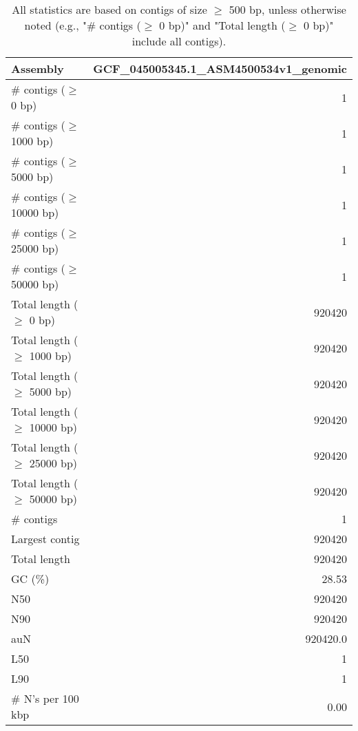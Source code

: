 \documentclass[12pt,a4paper]{article}
\begin{document}
\begin{table}[ht]
\begin{center}
\caption{All statistics are based on contigs of size $\geq$ 500 bp, unless otherwise noted (e.g., "\# contigs ($\geq$ 0 bp)" and "Total length ($\geq$ 0 bp)" include all contigs).}
\begin{tabular}{|l*{1}{|r}|}
\hline
Assembly & GCF\_045005345.1\_ASM4500534v1\_genomic \\ \hline
\# contigs ($\geq$ 0 bp) & 1 \\ \hline
\# contigs ($\geq$ 1000 bp) & 1 \\ \hline
\# contigs ($\geq$ 5000 bp) & 1 \\ \hline
\# contigs ($\geq$ 10000 bp) & 1 \\ \hline
\# contigs ($\geq$ 25000 bp) & 1 \\ \hline
\# contigs ($\geq$ 50000 bp) & 1 \\ \hline
Total length ($\geq$ 0 bp) & 920420 \\ \hline
Total length ($\geq$ 1000 bp) & 920420 \\ \hline
Total length ($\geq$ 5000 bp) & 920420 \\ \hline
Total length ($\geq$ 10000 bp) & 920420 \\ \hline
Total length ($\geq$ 25000 bp) & 920420 \\ \hline
Total length ($\geq$ 50000 bp) & 920420 \\ \hline
\# contigs & 1 \\ \hline
Largest contig & 920420 \\ \hline
Total length & 920420 \\ \hline
GC (\%) & 28.53 \\ \hline
N50 & 920420 \\ \hline
N90 & 920420 \\ \hline
auN & 920420.0 \\ \hline
L50 & 1 \\ \hline
L90 & 1 \\ \hline
\# N's per 100 kbp & 0.00 \\ \hline
\end{tabular}
\end{center}
\end{table}
\end{document}
